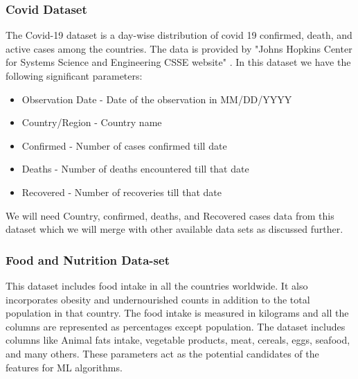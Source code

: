 \documentclass[journal,twoside,web]{ieeecolor}
\begin{document}
\subsubsection{Covid Dataset}
The Covid-19 dataset is a day-wise distribution of covid 19 confirmed, death, and active cases among the countries. The data is provided by "Johns Hopkins Center for Systems Science and Engineering CSSE website" \cite{noauthor_covid-19_nodate}. In this dataset we have the following significant parameters:


\begin{itemize}
    \item Observation Date - Date of the observation in MM/DD/YYYY
    \item Country/Region - Country name
    \item Confirmed - Number of cases confirmed till date
    \item Deaths - Number of deaths encountered till that date
    \item Recovered - Number of recoveries till that date
\end{itemize}
We will need Country, confirmed, deaths, and Recovered cases data from this dataset which we will merge with other available data sets as discussed further.

\subsubsection{Food and Nutrition Data-set}
This dataset includes food intake in all the countries worldwide. It also incorporates obesity and undernourished counts in addition to the total population in that country. The food intake is measured in kilograms and all the columns are represented as percentages except population. The dataset includes columns like Animal fats intake, vegetable products, meat, cereals, eggs, seafood, and many others. These parameters act as the potential candidates of the features for ML algorithms.
\end{document}
